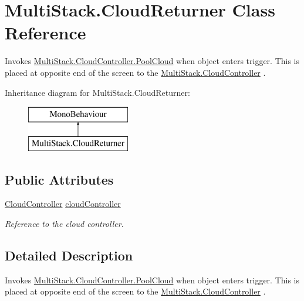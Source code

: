 \hypertarget{class_multi_stack_1_1_cloud_returner}{}\section{Multi\+Stack.\+Cloud\+Returner Class Reference}
\label{class_multi_stack_1_1_cloud_returner}


Invokes \hyperlink{class_multi_stack_1_1_cloud_controller_a10db53c6e52758567af0bcaf8394b43d}{Multi\+Stack.\+Cloud\+Controller.\+Pool\+Cloud} when object enters trigger. This is placed at opposite end of the screen to the \hyperlink{class_multi_stack_1_1_cloud_controller}{Multi\+Stack.\+Cloud\+Controller} .  


Inheritance diagram for Multi\+Stack.\+Cloud\+Returner\+:\begin{figure}[H]
\begin{center}
\leavevmode
\includegraphics[height=2.000000cm]{class_multi_stack_1_1_cloud_returner}
\end{center}
\end{figure}
\subsection*{Public Attributes}
\begin{DoxyCompactItemize}
\item 
\hyperlink{class_multi_stack_1_1_cloud_controller}{Cloud\+Controller} \hyperlink{class_multi_stack_1_1_cloud_returner_a2a2c664211730eb172f05007161a37e1}{cloud\+Controller}
\begin{DoxyCompactList}\small\item\em Reference to the cloud controller. \end{DoxyCompactList}\end{DoxyCompactItemize}


\subsection{Detailed Description}
Invokes \hyperlink{class_multi_stack_1_1_cloud_controller_a10db53c6e52758567af0bcaf8394b43d}{Multi\+Stack.\+Cloud\+Controller.\+Pool\+Cloud} when object enters trigger. This is placed at opposite end of the screen to the \hyperlink{class_multi_stack_1_1_cloud_controller}{Multi\+Stack.\+Cloud\+Controller} . 



